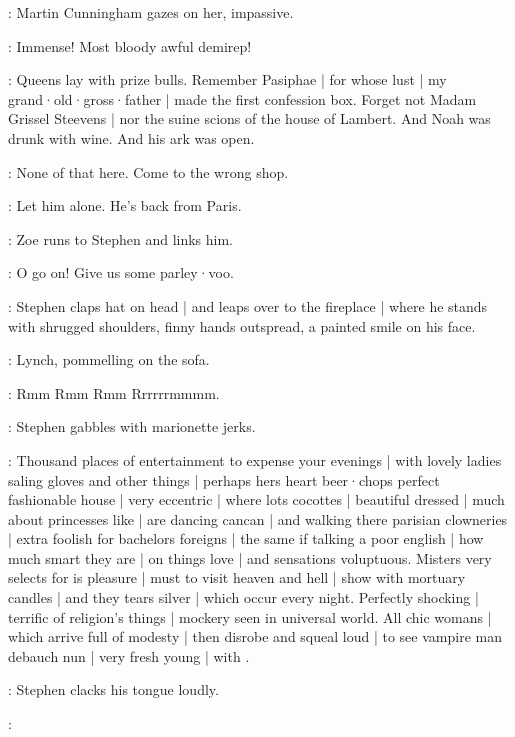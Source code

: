 :
Martin Cunningham gazes on her,
impassive.

\MartinCunningham:
Immense!
Most bloody awful demirep!


\Stephen:
Queens lay with prize bulls.
Remember Pasiphae |
for whose lust |
my grand·old·gross·father |
made the first confession box.
Forget not Madam Grissel Steevens |
nor the suine scions of the house of Lambert.
And Noah was drunk with wine.
And his ark was open.

\Bella:
None of that here.
Come to the wrong shop.

\Lynch:
Let him alone.
He's back from Paris.

:
Zoe runs to Stephen and links him.

\Zoe:
O go on!
Give us some parley·voo.

:
Stephen claps hat on head |
and leaps over to the fireplace |
where he stands with shrugged shoulders,
finny hands outspread,
a painted smile on his face.

:
Lynch,
pommelling on the sofa.

\Lynch:
Rmm Rmm Rmm Rrrrrrmmmm.

:
Stephen gabbles with marionette jerks.

\Stephen:
Thousand places of entertainment to expense your evenings |
with lovely ladies saling gloves and other things |
perhaps hers heart beer·chops perfect fashionable house |
very eccentric |
where lots cocottes |
beautiful dressed |
much about princesses like |
are dancing cancan |
and walking there parisian clowneries |
extra foolish for bachelors foreigns |
the same if talking a poor english |
how much smart they are |
on things love |
and sensations voluptuous.
Misters very selects for is pleasure |
must to visit heaven and hell |
show with mortuary candles |
and they tears silver |
which occur every night.
%
Perfectly shocking |
terrific of religion's things |
mockery seen in universal world.
All chic womans |
which arrive full of modesty |
then disrobe and squeal loud |
to see vampire man debauch nun |
very fresh young |
with .

:
Stephen clacks his tongue loudly.

\Stephen:

